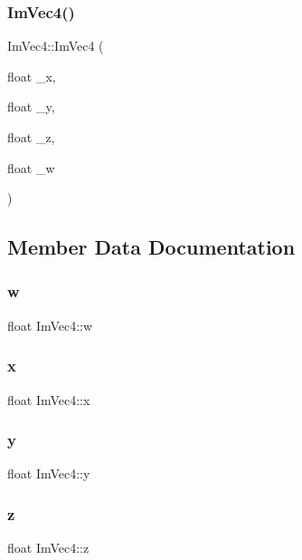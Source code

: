 \hypertarget{struct_im_vec4_af9e535f36b0fc7b9af0f60951fb4ffe4}{}\label{struct_im_vec4_af9e535f36b0fc7b9af0f60951fb4ffe4} 
\subsubsection{\texorpdfstring{Im\+Vec4()}{ImVec4()}\hspace{0.1cm}{\footnotesize\ttfamily [2/2]}}
{\footnotesize\ttfamily Im\+Vec4\+::\+Im\+Vec4 (\begin{DoxyParamCaption}\item[{float}]{\+\_\+x,  }\item[{float}]{\+\_\+y,  }\item[{float}]{\+\_\+z,  }\item[{float}]{\+\_\+w }\end{DoxyParamCaption})}



\subsection{Member Data Documentation}
\hypertarget{struct_im_vec4_afeed5acd9f0d2043175f4da229d12a38}{}\label{struct_im_vec4_afeed5acd9f0d2043175f4da229d12a38} 
\subsubsection{\texorpdfstring{w}{w}}
{\footnotesize\ttfamily float Im\+Vec4\+::w}

\hypertarget{struct_im_vec4_a2090f651f5e5b78fedae8dab87343db6}{}\label{struct_im_vec4_a2090f651f5e5b78fedae8dab87343db6} 
\subsubsection{\texorpdfstring{x}{x}}
{\footnotesize\ttfamily float Im\+Vec4\+::x}

\hypertarget{struct_im_vec4_a6b4d00ae261be4fe54353c759c561fe7}{}\label{struct_im_vec4_a6b4d00ae261be4fe54353c759c561fe7} 
\subsubsection{\texorpdfstring{y}{y}}
{\footnotesize\ttfamily float Im\+Vec4\+::y}

\hypertarget{struct_im_vec4_aba6a75356917a28c967954bb29133a1a}{}\label{struct_im_vec4_aba6a75356917a28c967954bb29133a1a} 
\subsubsection{\texorpdfstring{z}{z}}
{\footnotesize\ttfamily float Im\+Vec4\+::z}

